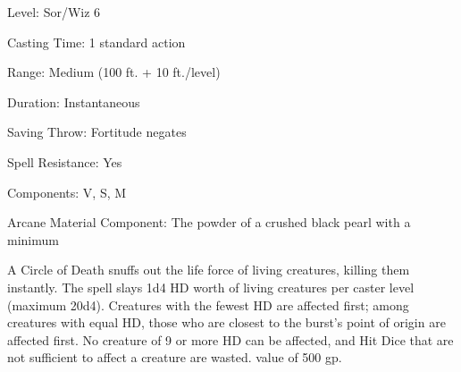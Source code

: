 
\begin{description*}
\item[Level:] Sor/Wiz 6
\item[Casting Time:] 1 standard action
\item[Range:] Medium (100 ft. + 10 ft./level)
\item[Duration:] Instantaneous
\item[Saving Throw:] Fortitude negates
\item[Spell Resistance:] Yes
\item[Components:] V, S, M
\item[Arcane Material Component:] The powder of a crushed black pearl with a minimum
\end{description*}

A Circle of Death snuffs out the life force of living creatures, killing
them instantly.
The spell slays 1d4 HD worth of living creatures per caster level (maximum 20d4).
Creatures with the fewest HD are affected first; among creatures with equal HD,
those who are closest to the burst's point of origin are affected first. No creature
of 9 or more HD can be affected, and Hit Dice that are not sufficient to affect
a creature are wasted.
value of 500 gp.